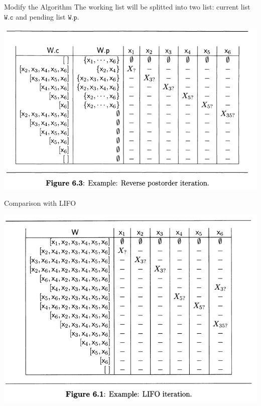 \documentclass[aspectratio=1610, 13pt]{beamer}
\begin{document}
\begin{frame}{Modify the Algorithm}
The working list will be splitted into two list: current list $\texttt{W.c}$ and pending list $\texttt{W.p}$.

\begin{center}
\includegraphics[scale=0.45]{rpe.png}
\end{center}
\end{frame}

\begin{frame}{Comparison with LIFO}
\begin{center}
\includegraphics[scale=0.45]{lifotable.png}
\end{center}
\end{frame}
\end{document}
